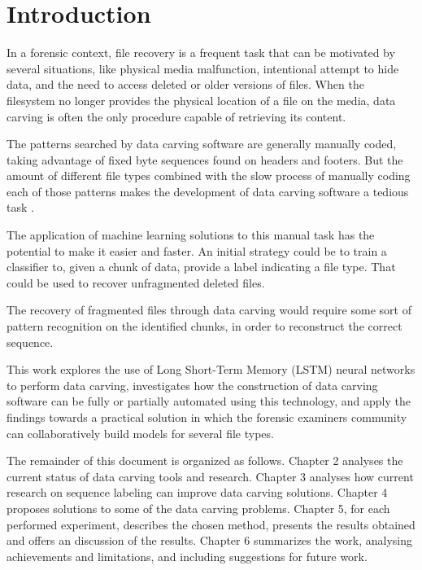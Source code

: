 \chapter{\label{chap:introduction}Introduction}

In a forensic context, file recovery is a frequent task that can be motivated by several situations, like physical media malfunction, intentional attempt to hide data, and the need to access deleted or older versions of files. When the filesystem no longer provides the physical location of a file on the media, data carving is often the only procedure capable of retrieving its content.


The patterns searched by data carving software are generally manually coded, taking advantage of fixed byte sequences found on headers and footers. But the amount of different file types combined with the slow process of manually coding each of those patterns makes the development of data carving software a tedious task \cite{mcdaniel_content_2003}.

The application of machine learning solutions to this manual task has the potential to make it easier and faster. An initial strategy could be to train a classifier to, given a chunk of data, provide a label indicating a file type. That could be used to recover unfragmented deleted files.

The recovery of fragmented files through data carving would require some sort of pattern recognition on the identified chunks, in order to reconstruct the correct sequence.


This work explores the use of Long Short-Term Memory (LSTM) neural networks to perform data carving, investigates how the construction of data carving software can be fully or partially automated using this technology, and apply the findings towards a practical solution in which the forensic examiners community     can collaboratively build models for several file types.


The remainder of this document is organized as follows.
    Chapter 2 analyses the current status of data carving tools and research. 
    Chapter 3 analyses how current research on sequence labeling can improve data carving solutions.
    Chapter 4 proposes solutions to some of the data carving problems.
    Chapter 5, for each performed experiment, describes the chosen method, presents the results obtained and offers an discussion of the results.
    Chapter 6 summarizes the work, analysing achievements and limitations, and including suggestions for future work.
